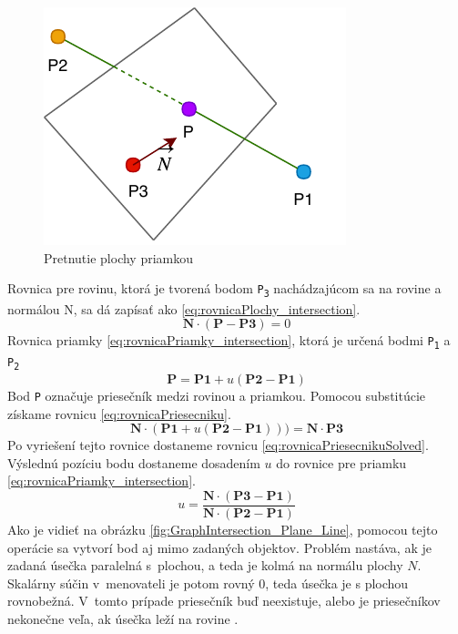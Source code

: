 \begin{figure}[H]
	\centering
	\includegraphics[height=0.3\textwidth]{obrazky-figures/DP Navrh operacii-Intersection.pdf}
	\caption{Pretnutie plochy priamkou}
	\label{fig:Intersection}
\end{figure}
Rovnica pre rovinu, ktorá je tvorená bodom \texttt{P\textsubscript{3}} nachádzajúcom sa na rovine a normálou N, sa dá zapísať ako \ref{eq:rovnicaPlochy_intersection}. 
\begin{equation}
    \textbf{N} \cdot (\textbf{P} - \textbf{P3}) = 0
	\label{eq:rovnicaPlochy_intersection}
\end{equation}
Rovnica priamky \ref{eq:rovnicaPriamky_intersection}, ktorá je určená bodmi \texttt{P\textsubscript{1}} a \texttt{P\textsubscript{2}}
\begin{equation}
	\textbf{P}=\textbf{P1}+u (\textbf{P2}-\textbf{P1})
    \label{eq:rovnicaPriamky_intersection}
\end{equation}
Bod \texttt{P} označuje priesečník medzi rovinou a priamkou. Pomocou substitúcie získame rovnicu \ref{eq:rovnicaPriesecniku}.
\begin{equation}
	\textbf{N} \cdot (\textbf{P1}+u(\textbf{P2}-\textbf{P1}))) = \textbf{N} \cdot \textbf{P3}
    \label{eq:rovnicaPriesecniku}
\end{equation}
Po vyriešení tejto rovnice dostaneme rovnicu \ref{eq:rovnicaPriesecnikuSolved}. Výslednú pozíciu bodu dostaneme dosadením $u$ do rovnice pre  priamku \ref{eq:rovnicaPriamky_intersection}.
\begin{equation}
	u=\frac
{\textbf{N} \cdot (\textbf{P3}-\textbf{P1})}
{\textbf{N} \cdot (\textbf{P2}-\textbf{P1})}
    \label{eq:rovnicaPriesecnikuSolved}
\end{equation}
Ako je vidieť na obrázku \ref{fig:GraphIntersection_Plane_Line}, pomocou tejto operácie sa vytvorí bod aj mimo zadaných objektov. Problém nastáva, ak je zadaná úsečka paralelná s~plochou, a teda je kolmá na normálu plochy $N$. Skalárny súčin v~menovateli je potom rovný 0, teda úsečka je s plochou rovnobežná. V~tomto prípade priesečník buď neexistuje, alebo je priesečníkov nekonečne veľa, ak úsečka leží na rovine \cite{bourke_Point_Line_Plane}.

